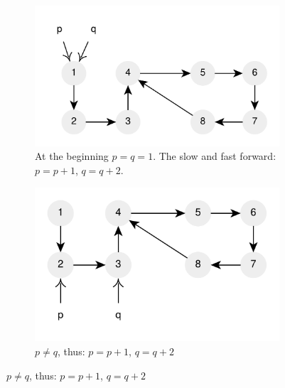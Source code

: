 



\begin{figure}
	\vspace*{-0.8in}
	\centering
	\begin{subfigure}[t]{0.36\textwidth}
		\includegraphics[width=1\linewidth]{sources/cycle_in_list/images/floyd1}
		\caption{At the beginning $p=q=1$. The slow and fast forward: $p=p+1$, $q=q+2$.}
		\label{fig:cycle_in_list:floyd1}
	 \end{subfigure}
	\hfill
	\begin{subfigure}[t]{0.36\textwidth}
		\includegraphics[width=1\linewidth]{sources/cycle_in_list/images/floyd2}
		\caption{$p \neq q$,  thus: $p=p+1$, $q=q+2$}

\end{subfigure}
\end{figure}
